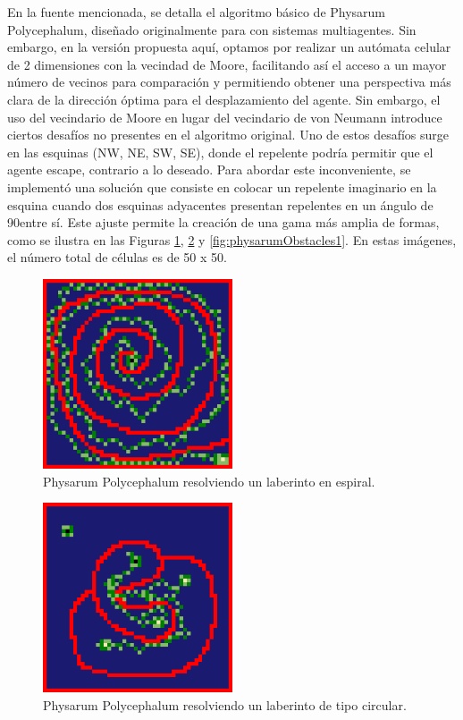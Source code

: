     \vskip 0.5cm
    En la fuente mencionada, se detalla el algoritmo b\'asico de Physarum Polycephalum, dise\~nado originalmente para con
        sistemas multiagentes. Sin embargo, en la versi\'on propuesta aqu\'i, optamos por realizar un aut\'omata celular de 2 dimensiones con la vecindad de Moore, 
        facilitando as\'i el acceso a un mayor n\'umero de vecinos para comparaci\'on y permitiendo obtener una perspectiva m\'as clara de la direcci\'on \'optima 
        para el desplazamiento del agente.
    \vskip 0.5cm
    Sin embargo, el uso del vecindario de Moore en lugar del vecindario de von Neumann introduce ciertos desaf\'ios no presentes en el algoritmo original. 
        Uno de estos desaf\'ios surge en las esquinas (NW, NE, SW, SE), donde el repelente podr\'ia permitir que el agente escape, 
        contrario a lo deseado. Para abordar este inconveniente, se implement\'o una soluci\'on que consiste en colocar un repelente imaginario en la esquina cuando 
        dos esquinas adyacentes presentan repelentes en un \'angulo de 90\degree  entre s\'i. Este ajuste permite la creaci\'on de una gama m\'as amplia de formas, 
        como se ilustra en las Figuras \ref{fig:physarumCircle1}, 
        \ref{fig:physarumRandom1} y \ref{fig:physarumObstacles1}. En estas im\'agenes, el n\'umero total de c\'elulas es de 50 x 50.
    \vskip 0.5cm
    \begin{figure}[htbp]
        \centerline{\includegraphics[width=0.5\textwidth]{./images/desarrollo/physarum/Circular1.png}}
        \caption{Physarum Polycephalum resolviendo un laberinto en espiral.} 
        \label{fig:physarumCircle1}    
    \end{figure}
    \begin{figure}[htbp]
        \centerline{\includegraphics[width=0.5\textwidth]{./images/desarrollo/physarum/Random1.png}}
        \caption{Physarum Polycephalum resolviendo un laberinto de tipo circular.}
        \label{fig:physarumRandom1}    
    \end{figure}
